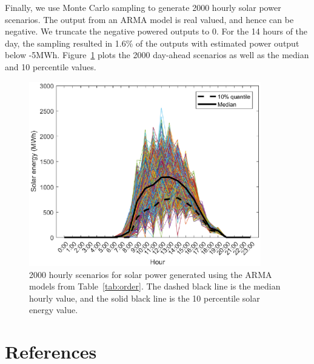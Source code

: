 \documentclass[review]{elsarticle}
\begin{document}
Finally, we use Monte Carlo sampling to generate 2000 hourly solar power 
scenarios. The output from an ARMA model is real valued, and hence can be 
negative. We truncate the negative powered outputs to 0. For the 14 hours of 
the day, the sampling resulted in 1.6\% of the outputs with estimated power 
output below -5MWh. Figure~\ref{fig:sample} plots the 2000 day-ahead scenarios 
as well as the median and 10 percentile values. 


\begin{figure}[!t]
\centering
\includegraphics[width=0.9\textwidth]{sample.eps}
\caption{2000 hourly scenarios for solar power generated using the ARMA models 
from Table~\ref{tab:order}. The dashed black line is the median hourly value, 
and the solid black line is
the 10 percentile solar energy value.}
 \label{fig:sample}
\end{figure}
\section*{References}


\end{document}
